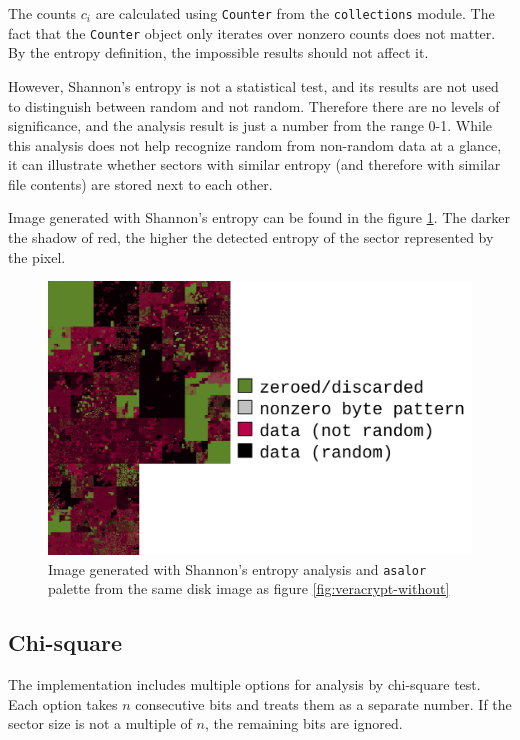 \documentclass[
  digital, %
  color,   %
  oneside, %
  lof,     %
  nolot,     %
]{fithesis4}
\begin{document}
The counts $c_i$ are calculated using \texttt{Counter} from the \texttt{collections} module\cite{collections}.
The fact that the \texttt{Counter} object only iterates over nonzero counts does not matter.
By the entropy definition, the impossible results should not affect it.

However, Shannon's entropy is not a statistical test, and its results are not used to distinguish between random and not random.
Therefore there are no levels of significance, and the analysis result is just a number from the range 0-1.
While this analysis does not help recognize random from non-random data at a glance, it can illustrate whether sectors with similar entropy (and therefore with similar file contents) are stored next to each other. 

Image generated with Shannon's entropy can be found in the figure \ref{fig:impl-shannon}.
The darker the shadow of red, the higher the detected entropy of the sector represented by the pixel.

\begin{figure}
    \centering
    \includegraphics[width=\textwidth,interpolate=false]{ubnt-unencrypted-shannon-hilbert-asalor.png}
    \caption{Image generated with Shannon's entropy analysis and \texttt{asalor} palette from the same disk image as figure \ref{fig:veracrypt-without}}
    \label{fig:impl-shannon}
\end{figure}

\subsection{Chi-square}
\label{ssec:chi2}

The implementation includes multiple options for analysis by chi-square test.
Each option takes $n$ consecutive bits and treats them as a separate number.
If the sector size is not a multiple of $n$, the remaining bits are ignored.
\end{document}
